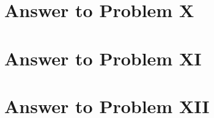 \documentclass[11pt,a4paper]{article}
\begin{document}
\section{Answer to Problem X}\label{sec:P10}



\clearpage

\section{Answer to Problem XI}\label{sec:P11}



\clearpage

\section{Answer to Problem XII}\label{sec:P12}



\clearpage


\printbibliography

\end{document}
